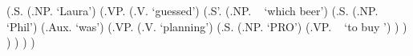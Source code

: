 \documentclass[12pt,letterpaper]{article}
\newcommand{\gap}{\underline{\hspace{1em}} }
\begin{document}
\begin{parsetree}
  
  (.S.
    (.NP. `Laura')
    (.VP.
      (.V. `guessed')
      (.S'.
        (.NP. ~ `which beer')
        (.S.
          (.NP. `Phil')
          (.Aux. `was')
          (.VP.
            (.V. `planning')
            (.S.
              (.NP. `PRO')
              (.VP. ~ `to buy \gap')
            )
          )
        )
      )
    )
  )
  
\end{parsetree}
\end{document}
